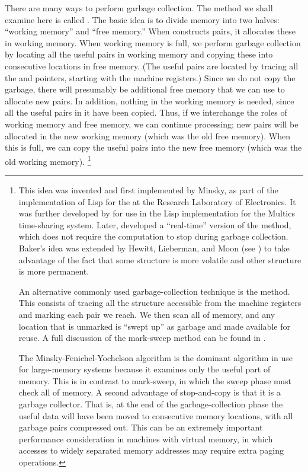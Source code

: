 There are many ways to perform garbage collection.
The method we shall examine here is called .
The basic idea is to divide memory into two halves:
“working memory” and  “free memory.”
When  constructs pairs, it allocates these in working memory.
When working memory is full, we perform garbage collection by locating all the useful pairs in working memory and copying these into consecutive locations in free memory.
(The useful pairs are located by tracing all the  and  pointers, starting with the machine registers.)
Since we do not copy the garbage, there will presumably be additional free memory that we can use to allocate new pairs.
In addition, nothing in the working memory is needed, since all the useful pairs in it have been copied.
Thus, if we interchange the roles of working memory and free memory, we can continue processing;
new pairs will be allocated in the new working memory (which was the old free memory).
When this is full, we can copy the useful pairs into the new free memory (which was the old working memory).%
\footnote{
	This idea was invented and first implemented by Minsky, as part of the implementation of Lisp for the  at the  Research Laboratory of Electronics.
	It was further developed by  for use in the Lisp implementation for the Multics time-sharing system.
	Later,  developed a “real-time” version of the method, which does not require the computation to stop during garbage collection.
	Baker’s idea was extended by Hewitt, Lieberman, and Moon (see ) to take advantage of the fact that some structure is more volatile and other structure is more permanent.

	An alternative commonly used garbage-collection technique is the  method.
	This consists of tracing all the structure accessible from the machine registers and marking each pair we reach.
	We then scan all of memory, and any location that is unmarked is “swept up” as garbage and made available for reuse.
	A full discussion of the mark-sweep method can be found in \autocite{allen_anatomy_of_lisp}.

	The Minsky-Fenichel-Yochelson algorithm is the dominant algorithm in use for large-memory systems because it examines only the useful part of memory.
	This is in contrast to mark-sweep, in which the sweep phase must check all of memory.
	A second advantage of stop-and-copy is that it is a  garbage collector.
	That is, at the end of the garbage-collection phase the useful data will have been moved to consecutive memory locations, with all garbage pairs compressed out.
	This can be an extremely important performance consideration in machines with virtual memory, in which accesses to widely separated memory addresses may require extra paging operations.
}



